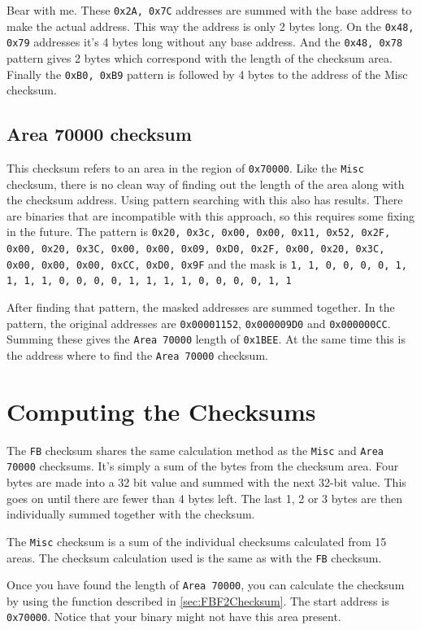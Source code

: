 \documentclass[11pt,a4paper]{book}
\begin{document}
Bear with me. These \texttt{0x2A, 0x7C} addresses are summed with the base
address to make the actual address. This way the address is only 2 bytes long.
On the \texttt{0x48, 0x79} addresses it's 4 bytes long without any base address.
And the \texttt{0x48, 0x78} pattern gives 2 bytes which correspond with the
length of the checksum area. Finally the \texttt{0xB0, 0xB9} pattern is followed
by 4 bytes to the address of the Misc checksum.

\subsection{Area 70000 checksum}
This checksum refers to an area in the region of
\texttt{0x70000}. Like the \texttt{Misc} checksum, there is no clean way of
finding out the length of the area along with the checksum address. Using
pattern searching with this also has results. There are binaries that are
incompatible with this approach, so this requires some fixing in the future. The
pattern is \texttt{0x20, 0x3c, 0x00, 0x00, 0x11, 0x52, 0x2F, 0x00, 0x20, 0x3C,
    0x00, 0x00, 0x09, 0xD0, 0x2F, 0x00, 0x20, 0x3C, 0x00, 0x00, 0x00, 0xCC,
0xD0, 0x9F} and the mask is \texttt{1, 1, 0, 0, 0, 0, 1, 1, 1, 1, 0, 0, 0, 0, 1,
1, 1, 1, 0, 0, 0, 0, 1, 1}

After finding that pattern, the masked addresses are summed together. In the
pattern, the original addresses are \texttt{0x00001152}, \texttt{0x000009D0} and
\texttt{0x000000CC}. Summing these gives the \texttt{Area 70000} length of
\texttt{0x1BEE}. At the same time this is the address where to find the \texttt{Area
70000} checksum.

\section{Computing the Checksums}
The \texttt{FB} checksum shares the same calculation method as the \texttt{Misc}
and \texttt{Area 70000} checksums. It's simply a sum of the bytes from the
checksum area. Four bytes are made into a 32 bit value and summed with the next
32-bit value. This goes on until there are fewer than 4 bytes left. The last 1,
2 or 3 bytes are then individually summed together with the checksum.

The \texttt{Misc} checksum is a sum of the individual checksums calculated from
15 areas. The checksum calculation used is the same as with the \texttt{FB}
checksum.

Once you have found the length of \texttt{Area 70000}, you can calculate the
checksum by using the function described in \cref{sec:FBF2Checksum}. The start
address is \texttt{0x70000}. Notice that your binary might not have this area
present.
\end{document}

